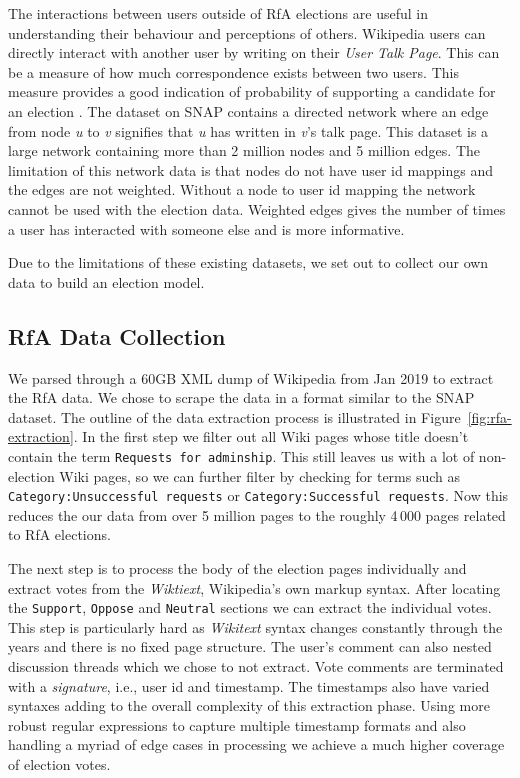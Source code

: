 The interactions between users outside of RfA elections are useful in understanding their behaviour and perceptions of others. Wikipedia users can directly interact with another user by writing on their \textit{User Talk Page}. This can be a measure of how much correspondence exists between two users. This measure provides a good indication of probability of supporting a candidate for an election \cite{leskovec2010governance}. The \wikitalk dataset on SNAP contains a directed network where an edge from node \textit{u} to \textit{v} signifies that \textit{u} has written in \textit{v}'s talk page. This dataset is a large network containing more than 2 million nodes and 5 million edges. The limitation of this network data is that nodes do not have user id mappings and the edges are not weighted. Without a node to user id mapping the network cannot be used with the election data. Weighted edges gives the number of times a user has interacted with someone else and is more informative. 
\smallskip

Due to the limitations of these existing datasets, we set out to collect our own data to build an election model.

\subsection{RfA Data Collection}

We parsed through a 60GB XML dump of Wikipedia from Jan 2019 to extract the RfA data. We chose to scrape the data in a format similar to the SNAP \wikirfa dataset. The outline of the data extraction process is illustrated in Figure~\ref{fig:rfa-extraction}. In the first step we filter out all Wiki pages whose title doesn't contain the term \texttt{Requests for adminship}. This still leaves us with a lot of non-election Wiki pages, so we can further filter by checking for terms such as \texttt{Category:Unsuccessful requests} or \texttt{Category:Successful requests}. Now this reduces the our data from over 5 million pages to the roughly 4\,000 pages related to RfA elections.

The next step is to process the body of the election pages individually and extract votes from the \textit{Wiktiext}, Wikipedia's own markup syntax. After locating the \texttt{Support}, \texttt{Oppose} and \texttt{Neutral} sections we can extract the individual votes. This step is particularly hard as \textit{Wikitext} syntax changes constantly through the years and there is no fixed page structure. The user's comment can also nested discussion threads which we chose to not extract. Vote comments are terminated with a \textit{signature}, i.e., user id and timestamp. The timestamps also have varied syntaxes adding to the overall complexity of this extraction phase. Using more robust regular expressions to capture multiple timestamp formats and also handling a myriad of edge cases in processing we achieve a much higher coverage of election votes. 

